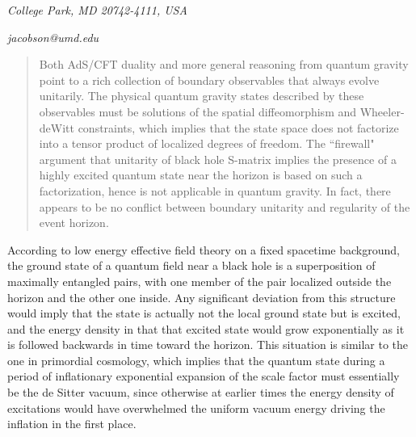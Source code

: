 \documentclass[12pt]{article}
\begin{document}
{\centerline{\it College Park, MD 20742-4111, USA}
{\centerline{\it jacobson@umd.edu}
}

\vskip 1cm

\begin{abstract}{\small
Both AdS/CFT duality and more general reasoning from quantum gravity
point to a rich collection of boundary observables that always evolve unitarily.
The physical quantum gravity states described by these observables
must be solutions of the spatial diffeomorphism and Wheeler-deWitt constraints,
which implies that the state space does not factorize into a tensor product 
of localized degrees of freedom. The ``firewall" argument that unitarity of 
black hole S-matrix implies the presence of a highly excited quantum state
near the horizon is based on such a factorization, hence is not applicable 
in quantum gravity. In fact, there appears to be no conflict between boundary unitarity
and regularity of the event horizon.} 
\end{abstract}






According to low energy effective
field theory on a fixed spacetime background, the 
ground state of a quantum field near a black hole is 
a superposition of maximally entangled pairs, with one member of the pair localized
outside the horizon and the other one inside. Any significant deviation from this structure
would imply that the state is actually not the local ground state but is excited, 
and the energy density in that that excited state would grow exponentially as it is 
followed backwards in time toward the horizon.  This situation is similar 
to the one in primordial cosmology,
which implies that the quantum state during a period of inflationary exponential expansion
of the scale factor must essentially be the de Sitter vacuum, since otherwise at earlier times
the energy density of excitations would have overwhelmed the uniform vacuum energy driving
the inflation in the first place. 

}
\end{document}
